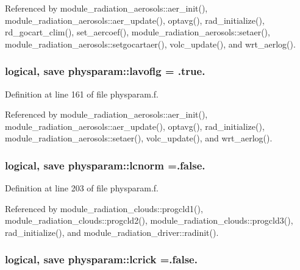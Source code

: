 Referenced by module\+\_\+radiation\+\_\+aerosols\+::aer\+\_\+init(), module\+\_\+radiation\+\_\+aerosols\+::aer\+\_\+update(), optavg(), rad\+\_\+initialize(), rd\+\_\+gocart\+\_\+clim(), set\+\_\+aercoef(), module\+\_\+radiation\+\_\+aerosols\+::setaer(), module\+\_\+radiation\+\_\+aerosols\+::setgocartaer(), volc\+\_\+update(), and wrt\+\_\+aerlog().

\subsubsection[{\texorpdfstring{lavoflg}{lavoflg}}]{\setlength{\rightskip}{0pt plus 5cm}logical, save physparam\+::lavoflg = .true.}\hypertarget{namespacephysparam_a70a2b7af2c7f6f631ef05cb05ba6eb8c}{}\label{namespacephysparam_a70a2b7af2c7f6f631ef05cb05ba6eb8c}


Definition at line 161 of file physparam.\+f.



Referenced by module\+\_\+radiation\+\_\+aerosols\+::aer\+\_\+init(), module\+\_\+radiation\+\_\+aerosols\+::aer\+\_\+update(), optavg(), rad\+\_\+initialize(), module\+\_\+radiation\+\_\+aerosols\+::setaer(), volc\+\_\+update(), and wrt\+\_\+aerlog().

\subsubsection[{\texorpdfstring{lcnorm}{lcnorm}}]{\setlength{\rightskip}{0pt plus 5cm}logical, save physparam\+::lcnorm =.false.}\hypertarget{namespacephysparam_ae5b7bb287e8a1f935cf135ffeaadca7a}{}\label{namespacephysparam_ae5b7bb287e8a1f935cf135ffeaadca7a}


Definition at line 203 of file physparam.\+f.



Referenced by module\+\_\+radiation\+\_\+clouds\+::progcld1(), module\+\_\+radiation\+\_\+clouds\+::progcld2(), module\+\_\+radiation\+\_\+clouds\+::progcld3(), rad\+\_\+initialize(), and module\+\_\+radiation\+\_\+driver\+::radinit().

\subsubsection[{\texorpdfstring{lcrick}{lcrick}}]{\setlength{\rightskip}{0pt plus 5cm}logical, save physparam\+::lcrick =.false.}\hypertarget{namespacephysparam_a3506e1f83500ea78568ab697f55cadb4}{}\label{namespacephysparam_a3506e1f83500ea78568ab697f55cadb4}


